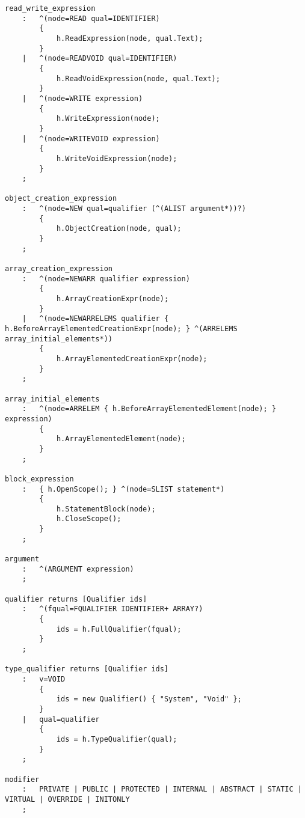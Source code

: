\begin{lstlisting}
read_write_expression
	:	^(node=READ qual=IDENTIFIER)
		{
			h.ReadExpression(node, qual.Text);
		}
	|	^(node=READVOID qual=IDENTIFIER)
		{
			h.ReadVoidExpression(node, qual.Text);
		}
	|	^(node=WRITE expression)
		{
			h.WriteExpression(node);
		}
	|	^(node=WRITEVOID expression)
		{
			h.WriteVoidExpression(node);
		}
	;

object_creation_expression
	:	^(node=NEW qual=qualifier (^(ALIST argument*))?)
		{
			h.ObjectCreation(node, qual);
		}
	;
	
array_creation_expression
	:	^(node=NEWARR qualifier expression)
		{
			h.ArrayCreationExpr(node);
		}
	|	^(node=NEWARRELEMS qualifier { h.BeforeArrayElementedCreationExpr(node); } ^(ARRELEMS array_initial_elements*))
		{
			h.ArrayElementedCreationExpr(node);
		}
	;
	
array_initial_elements
	:	^(node=ARRELEM { h.BeforeArrayElementedElement(node); } expression)
		{
			h.ArrayElementedElement(node);
		}
	;
		
block_expression
	:	{ h.OpenScope(); } ^(node=SLIST statement*)
		{
			h.StatementBlock(node);
			h.CloseScope();
		}
	;

argument
	:	^(ARGUMENT expression)
	;

qualifier returns [Qualifier ids]
	:	^(fqual=FQUALIFIER IDENTIFIER+ ARRAY?)
		{
			ids = h.FullQualifier(fqual);
		}
	;
	
type_qualifier returns [Qualifier ids]
	:	v=VOID
		{
			ids = new Qualifier() { "System", "Void" };
		}
	|	qual=qualifier
		{
			ids = h.TypeQualifier(qual);
		}
	;

modifier
	:	PRIVATE | PUBLIC | PROTECTED | INTERNAL | ABSTRACT | STATIC | VIRTUAL | OVERRIDE | INITONLY
	;
\end{lstlisting}
